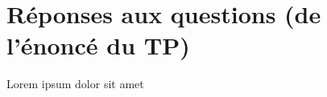 %
\section{Réponses aux questions (de l'énoncé du TP)}
\begin{frame}{\secname}
%
    Lorem ipsum dolor sit amet

    
\end{frame}
